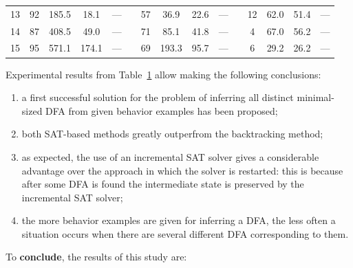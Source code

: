 \begin{table}
{\begin{tabular}{ccccccccccccccc}
      13 & 92  & 185.5 & 18.1  & ---            & & 57  & 36.9  & 22.6 & ---             & & 12  & 62.0 & 51.4 & ---\\
      14 & 87  & 408.5 & 49.0  & ---            & & 71  & 85.1  & 41.8 & ---             & & 4   & 67.0 & 56.2 & ---\\
      15 & 95  & 571.1 & 174.1 & ---            & & 69  & 193.3 & 95.7 & ---             & & 6   & 29.2 & 26.2 & ---\\
      \hline
    \end{tabular}
  }
  \label{syn-en:tab:find-all}
\end{table}

Experimental results from Table~\ref{syn-en:tab:find-all} allow making the following conclusions:
\begin{enumerate}
  \item a first successful solution for the problem of inferring all distinct minimal-sized DFA from given behavior examples has been proposed;
  \item both SAT-based methods greatly outperfrom the backtracking method;
  \item as expected, the use of an incremental SAT solver gives a considerable advantage over the approach in which the solver is restarted: this is because after some DFA is found the intermediate state is preserved by the incremental SAT solver;
  \item the more behavior examples  are given for inferring a DFA, the less often a situation occurs when there are several different DFA corresponding to them.
\end{enumerate}


To \textbf{conclude}, the results of this study are:

